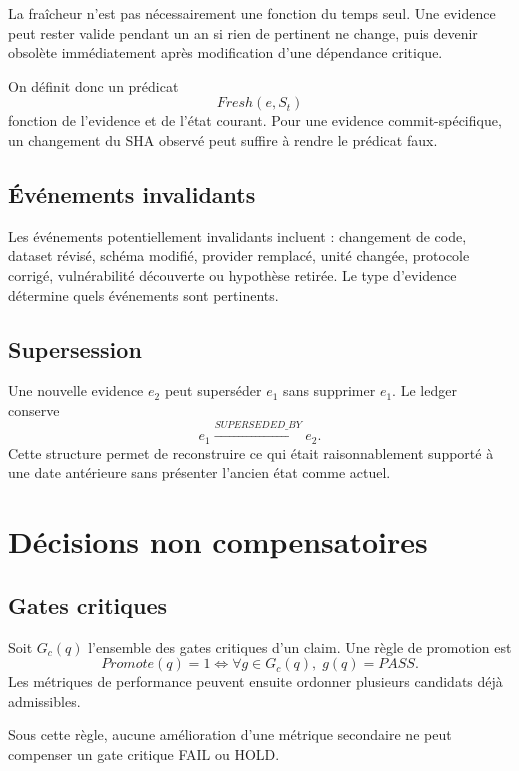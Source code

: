 La fraîcheur n'est pas nécessairement une fonction du temps seul. Une evidence peut rester valide pendant un an si rien de pertinent ne change, puis devenir obsolète immédiatement après modification d'une dépendance critique.

On définit donc un prédicat
\[
Fresh(e,S_t)
\]
fonction de l'evidence et de l'état courant. Pour une evidence commit-spécifique, un changement du SHA observé peut suffire à rendre le prédicat faux.

\section{Événements invalidants}

Les événements potentiellement invalidants incluent : changement de code, dataset révisé, schéma modifié, provider remplacé, unité changée, protocole corrigé, vulnérabilité découverte ou hypothèse retirée. Le type d'evidence détermine quels événements sont pertinents.

\section{Supersession}

Une nouvelle evidence $e_2$ peut superséder $e_1$ sans supprimer $e_1$. Le ledger conserve
\[
e_1\xrightarrow{SUPERSEDED\_BY}e_2.
\]
Cette structure permet de reconstruire ce qui était raisonnablement supporté à une date antérieure sans présenter l'ancien état comme actuel.

\chapter{Décisions non compensatoires}

\section{Gates critiques}

Soit $G_c(q)$ l'ensemble des gates critiques d'un claim. Une règle de promotion est
\[
Promote(q)=1\iff \forall g\in G_c(q),\;g(q)=PASS.
\]
Les métriques de performance peuvent ensuite ordonner plusieurs candidats déjà admissibles.

\begin{proposition}
Sous cette règle, aucune amélioration d'une métrique secondaire ne peut compenser un gate critique FAIL ou HOLD.
\end{proposition}

